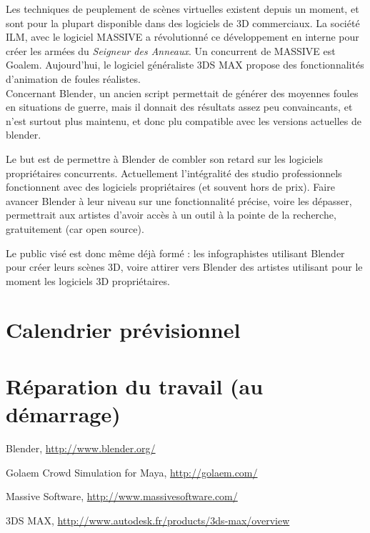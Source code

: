 \documentclass[a4paper,12pt]{article}
\begin{document}
Les techniques de peuplement de scènes virtuelles existent depuis un moment, et sont pour la plupart disponible dans des logiciels de 3D commerciaux. La société ILM, avec le logiciel MASSIVE\cite{Massive} a révolutionné ce développement en interne pour créer les armées du \textit{Seigneur des Anneaux}. Un concurrent de MASSIVE est Goalem\cite{Goalem}. Aujourd'hui, le logiciel généraliste 3DS MAX\cite{3dsmax} propose des fonctionnalités d'animation de foules réalistes. \\
Concernant Blender, un ancien script permettait de générer des moyennes foules en situations de guerre, mais il donnait des résultats assez peu convaincants, et n'est surtout plus maintenu, et donc plu compatible avec les versions actuelles de blender.

Le but est de permettre à Blender de combler son retard sur les logiciels propriétaires concurrents. Actuellement l'intégralité des studio professionnels fonctionnent avec des logiciels propriétaires (et souvent hors de prix). Faire avancer Blender à leur niveau sur une fonctionnalité précise, voire les dépasser, permettrait aux artistes d'avoir accès à un outil à la pointe de la recherche, gratuitement (car open source).

Le public visé est donc même déjà formé : les infographistes utilisant Blender pour créer leurs scènes 3D, voire attirer vers Blender des artistes utilisant pour le moment les logiciels 3D propriétaires.

\section{Calendrier prévisionnel}

\section{Réparation du travail (au démarrage)}



\newpage

\begin{thebibliography}{}

  Blender,
  \url{http://www.blender.org/}


  Golaem Crowd Simulation for Maya,
  \url{http://golaem.com/}


  Massive Software,
  \url{http://www.massivesoftware.com/}


  3DS MAX,
  \url{http://www.autodesk.fr/products/3ds-max/overview}

\end{thebibliography}
\end{document}
